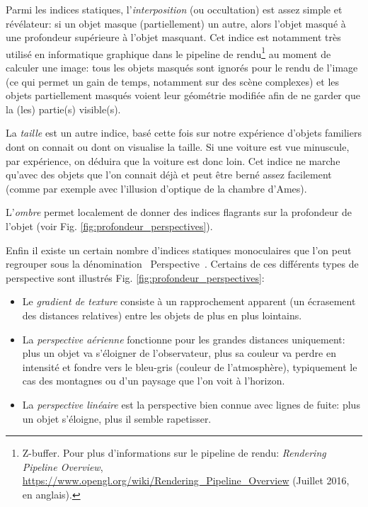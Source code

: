 	\par Parmi les indices statiques, l'\textit{interposition} (ou occultation) est assez simple et révélateur: si un objet masque (partiellement) un autre, alors l'objet masqué à une profondeur supérieure à l'objet masquant. Cet indice est notamment très utilisé en informatique graphique dans le pipeline de rendu\footnote{Z-buffer. Pour plus d'informations sur le pipeline de rendu: \textit{Rendering Pipeline Overview}, \url{https://www.opengl.org/wiki/Rendering_Pipeline_Overview} (Juillet 2016, en anglais).} au moment de calculer une image: tous les objets masqués sont ignorés pour le rendu de l'image (ce qui permet un gain de temps, notamment sur des scène complexes) et les objets partiellement masqués voient leur géométrie modifiée afin de ne garder que la (les) partie(s) visible(s).
	
	\par La \textit{taille} est un autre indice, basé cette fois sur notre expérience d'objets familiers dont on connait ou dont on visualise la taille. Si une voiture est vue minuscule, par expérience, on déduira que la voiture est donc loin. Cet indice ne marche qu'avec des objets que l'on connait déjà et peut être berné assez facilement (comme par exemple avec l'illusion d'optique de la chambre d'Ames).
		
	\par L'\textit{ombre} permet localement de donner des indices flagrants sur la profondeur de l'objet (voir Fig. \ref{fig:profondeur_perspectives}).
	
	\par Enfin il existe un certain nombre d'indices statiques monoculaires \citep{glassner_principles_1995, fuchs_traite_2003} que l'on peut regrouper sous la dénomination \guillemotleft~Perspective~\guillemotright . Certains de ces différents types de perspective sont illustrés Fig. \ref{fig:profondeur_perspectives}:
	\begin{itemize}
		\item Le \textit{gradient de texture} consiste à un rapprochement apparent (un écrasement des distances relatives) entre les objets de plus en plus lointains.
		\item La \textit{perspective aérienne} fonctionne pour les grandes distances uniquement: plus un objet va s'éloigner de l'observateur, plus sa couleur va perdre en intensité et fondre vers le bleu-gris (couleur de l'atmosphère), typiquement le cas des montagnes ou d'un paysage que l'on voit à l'horizon.	
		\item La \textit{perspective linéaire} est la perspective bien connue avec lignes de fuite: plus un objet s'éloigne, plus il semble rapetisser.
	\end{itemize}
	
